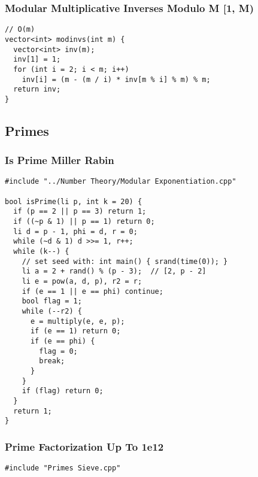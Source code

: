 \documentclass[twoside]{article}
\newcommand{\fileTitleStyle}{\large\underline}
\begin{document}
\begin{multicols*}{2}
\subsubsection*{Modular Multiplicative Inverses Modulo M [1, M)}
\addcontentsline{toc}{subsubsection}{Modular Multiplicative Inverses Modulo M [1, M)}
\begin{verbatim}
// O(m)
vector<int> modinvs(int m) {
  vector<int> inv(m);
  inv[1] = 1;
  for (int i = 2; i < m; i++)
    inv[i] = (m - (m / i) * inv[m % i] % m) % m;
  return inv;
}
\end{verbatim}

\subsectionfont{\centering\bfseries\LARGE}
\vspace{0em}
\subsection*{Primes}
\vspace{2em}
\subsubsectionfont{\centering\bfseries\Large}
\subsubsectionfont{\fileTitleStyle}
\subsubsection*{Is Prime Miller Rabin}
\begin{verbatim}
#include "../Number Theory/Modular Exponentiation.cpp"

bool isPrime(li p, int k = 20) {
  if (p == 2 || p == 3) return 1;
  if ((~p & 1) || p == 1) return 0;
  li d = p - 1, phi = d, r = 0;
  while (~d & 1) d >>= 1, r++;
  while (k--) {
    // set seed with: int main() { srand(time(0)); }
    li a = 2 + rand() % (p - 3);  // [2, p - 2]
    li e = pow(a, d, p), r2 = r;
    if (e == 1 || e == phi) continue;
    bool flag = 1;
    while (--r2) {
      e = multiply(e, e, p);
      if (e == 1) return 0;
      if (e == phi) {
        flag = 0;
        break;
      }
    }
    if (flag) return 0;
  }
  return 1;
}
\end{verbatim}

\subsubsectionfont{\centering\bfseries\Large}
\subsubsectionfont{\fileTitleStyle}
\subsubsection*{Prime Factorization Up To 1e12}
\begin{verbatim}
#include "Primes Sieve.cpp"


\end{verbatim}
\end{multicols*}
\end{document}
